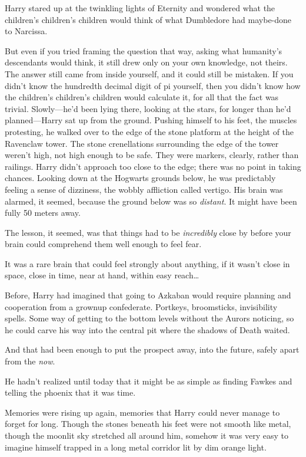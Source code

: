 Harry stared up at the twinkling lights of Eternity and wondered what the
children's children's children would think of what Dumbledore had maybe-done to
Narcissa.

But even if you tried framing the question that way, asking what humanity's
descendants would think, it still drew only on your own knowledge, not theirs.
The answer still came from inside yourself, and it could still be mistaken. If
you didn't know the hundredth decimal digit of pi yourself, then you didn't
know how the children's children's children would calculate it, for all that
the fact was trivial.
\later
Slowly---he'd been lying there, looking at the stars, for longer than he'd
planned---Harry sat up from the ground. Pushing himself to his feet, the
muscles protesting, he walked over to the edge of the stone platform at the
height of the Ravenclaw tower. The stone crenellations surrounding the edge of
the tower weren't high, not high enough to be safe. They were markers, clearly,
rather than railings. Harry didn't approach too close to the edge; there was no
point in taking chances. Looking down at the Hogwarts grounds below, he was
predictably feeling a sense of dizziness, the wobbly affliction called vertigo.
His brain was alarmed, it seemed, because the ground below was so
\emph{distant}. It might have been fully 50 meters away.

The lesson, it seemed, was that things had to be \emph{incredibly} close by
before your brain could comprehend them well enough to feel fear.

It was a rare brain that could feel strongly about anything, if it wasn't close
in space, close in time, near at hand, within easy reach{\ldots}

Before, Harry had imagined that going to Azkaban would require planning and
cooperation from a grownup confederate. Portkeys, broomsticks, invisibility
spells. Some way of getting to the bottom levels without the Aurors noticing,
so he could carve his way into the central pit where the shadows of Death
waited.

And that had been enough to put the prospect away, into the future, safely
apart from the \emph{now}.

He hadn't realized until today that it might be as simple as finding Fawkes and
telling the phoenix that it was time.

Memories were rising up again, memories that Harry could never manage to forget
for long. Though the stones beneath his feet were not smooth like metal, though
the moonlit sky stretched all around him, somehow it was very easy to imagine
himself trapped in a long metal corridor lit by dim orange light.

